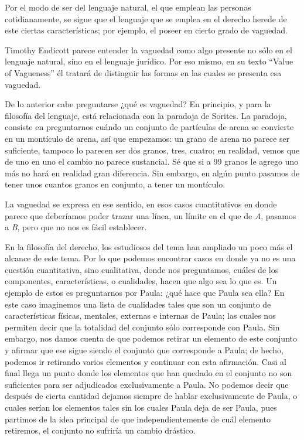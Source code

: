\documentclass[]{book}
\begin{document}
\begin{refsection}
Por el modo de ser del lenguaje natural, el que emplean las personas
cotidianamente, se sigue que el lenguaje que se emplea en el derecho
herede de este ciertas características; por ejemplo, el poseer en cierto
grado de vaguedad.

Timothy Endicott parece entender la vaguedad como algo presente no sólo
en el lenguaje natural, sino en el lenguaje jurídico. Por eso mismo, en
su texto ``Value of Vagueness'' él tratará de distinguir las formas en
las cuales se presenta esa vaguedad.

De lo anterior cabe preguntarse ¿qué es vaguedad? En principio, y para
la filosofía del lenguaje, está relacionada con la paradoja de Sorites.
La paradoja, consiste en preguntarnos cuándo un conjunto de partículas
de arena se convierte en un montículo de arena, así que empezamos: un
grano de arena no parece ser suficiente, tampoco lo parecen ser dos
granos, tres, cuatro; en realidad, vemos que de uno en uno el cambio no
parece sustancial. Sé que si a 99 granos le agrego uno más no hará en
realidad gran diferencia. Sin embargo, en algún punto pasamos de tener
unos cuantos granos en conjunto, a tener un montículo.

La vaguedad se expresa en ese sentido, en esos casos cuantitativos en
donde parece que deberíamos poder trazar una línea, un límite en el que
de \emph{A}, pasamos a \emph{B}, pero que no nos es fácil establecer.

En la filosofía del derecho, los estudiosos del tema han ampliado un
poco más el alcance de este tema. Por lo que podemos encontrar casos en
donde ya no es una cuestión cuantitativa, sino cualitativa, donde nos
preguntamos, cuáles de los componentes, características, o cualidades,
hacen que algo sea lo que es. Un ejemplo de estos es preguntarnos por
Paula: ¿qué hace que Paula sea ella? En este caso imaginemos una lista
de cualidades tales que son un conjunto de características físicas,
mentales, externas e internas de Paula; las cuales nos permiten decir
que la totalidad del conjunto sólo corresponde con Paula. Sin embargo,
nos damos cuenta de que podemos retirar un elemento de este conjunto y
afirmar que ese sigue siendo el conjunto que corresponde a Paula; de
hecho, podemos ir retirando varios elementos y continuar con esta
afirmación. Casi al final llega un punto donde los elementos que han
quedado en el conjunto no son suficientes para ser adjudicados
exclusivamente a Paula. No podemos decir que después de cierta cantidad
dejamos siempre de hablar exclusivamente de Paula, o cuales serían los
elementos tales sin los cuales Paula deja de ser Paula, pues partimos de
la idea principal de que independientemente de cuál elemento retiremos,
el conjunto no sufriría un cambio drástico.


\end{refsection}
\end{document}
